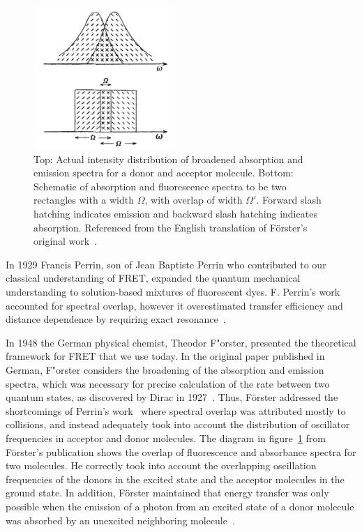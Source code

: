 \begin{figure}
    \centering
    \includegraphics[width=0.48\textwidth]{chapters/figures/spectral_overlap.jpg}
    \caption{\label{fig:spectral_overlap}
    Top: Actual intensity distribution of broadened absorption and emission spectra for a donor and acceptor molecule.
    Bottom: Schematic of absorption and fluorescence spectra to be two rectangles with a width $\Omega$, with overlap of width $\Omega'$.
    Forward slash hatching indicates emission and backward slash hatching indicates absorption.
    Referenced from the English translation of F{\"o}rster's original work~\cite{forster_1948,forster_english_1948}.
    }
\end{figure}

In 1929 Francis Perrin, son of Jean Baptiste Perrin who contributed to our classical understanding of FRET, expanded the quantum mechanical understanding to solution-based mixtures of fluorescent dyes. 
F. Perrin's work accounted for spectral overlap, however it overestimated transfer efficiency and distance dependence by requiring exact resonance~\cite{clegg_history, forster_1948}.

In 1948 the German physical chemist, Theodor F{"o}rster,
presented the theoretical framework for FRET that we use today. 
In the original paper published in German, F{"o}rster considers the broadening of the absorption and emission spectra, which was necessary for precise calculation of the rate between two quantum states, as discovered by Dirac in 1927~\cite{clegg_history}.
Thus, F{\"o}rster addressed the shortcomings of Perrin's work~\cite{forster_1948} where spectral overlap was attributed mostly to collisions, and instead adequately took into account the distribution of oscillator frequencies in acceptor and donor molecules. 
The diagram in figure~\ref{fig:spectral_overlap} from F{\"o}rster's publication shows the overlap of fluorescence and absorbance spectra for two molecules.
He correctly took into account the overlapping oscillation frequencies of the donors in the excited state and the acceptor molecules in the ground state.
In addition, F{\"o}rster maintained that energy transfer was only possible when the emission of a photon from an excited state of a donor molecule was absorbed by an unexcited neighboring molecule~\cite{forster_1948, forster_english_1948}. 

